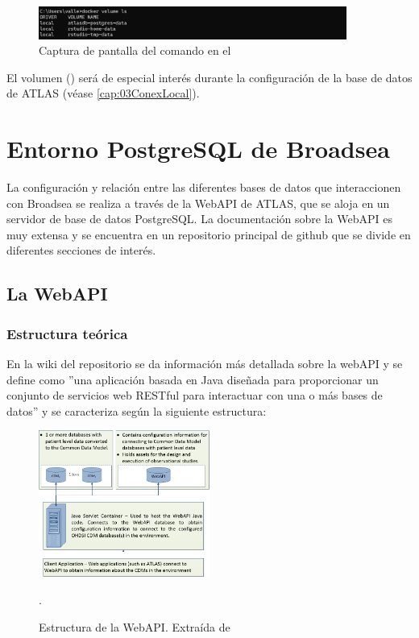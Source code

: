 \begin{figure}[H]
    \centering
    \includegraphics[width=0.90\textwidth]{figures/dockerVolumesCDM.png}
     \caption{Captura de pantalla del comando  en el }
    \label{fig:dockerVolumesCDM}
\end{figure}

El volumen  () será de especial interés durante la configuración de la base de datos de ATLAS (véase \ref{cap:03ConexLocal}).

\section{Entorno PostgreSQL de Broadsea}\label{01.4Postgre}

La configuración y relación entre las diferentes bases de datos que interaccionen con Broadsea se realiza a través de la WebAPI de ATLAS, que se aloja en un servidor de base de datos PostgreSQL. La documentación sobre la WebAPI es muy extensa y se encuentra en un repositorio principal de github \cite{githubWebAPI} que se divide en diferentes secciones de interés.

\subsection{La WebAPI}

\subsubsection{Estructura teórica}

En la wiki del repositorio \cite{githubWebAPIwiki} se da información más detallada sobre la webAPI y se define como ''una aplicación basada en Java diseñada para proporcionar un conjunto de servicios web RESTful para interactuar con una o más bases de datos'' y se caracteriza según la siguiente estructura:

\begin{figure}[H]
    \centering
    \includegraphics[width=0.50\textwidth]{figures/webAPIwiki.png}
     \caption{Estructura de la WebAPI. Extraída de \cite{githubWebAPIwiki}}.
    \label{fig:webAPIwiki}
\end{figure}

